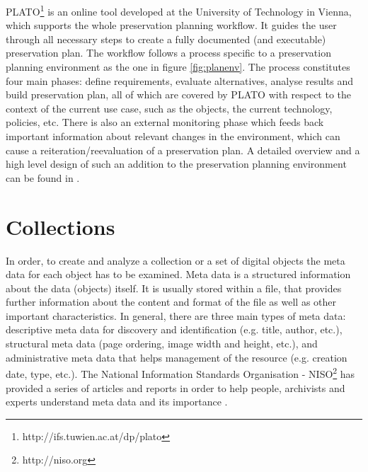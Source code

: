 PLATO\footnote{http://ifs.tuwien.ac.at/dp/plato} is an online tool developed at the University of Technology in Vienna, which supports the whole preservation planning workflow.
It guides the user through all necessary steps to create a fully documented (and executable) preservation plan. The workflow follows a process specific to a preservation planning environment as the one in figure \ref{fig:planenv}. The process constitutes four main phases: define requirements, evaluate alternatives, analyse results and build preservation plan, all of which are covered by PLATO with respect to the context of the current use case, such as the objects, the current technology, policies, etc.
There is also an external monitoring phase which feeds back important information about relevant changes in the environment, which can cause a reiteration/reevaluation of a preservation plan. A detailed overview and a high level design of such an addition to the preservation planning environment can be found in \cite{duretec:2012:watch}.



\section{Collections}
In order, to create and analyze a collection or a set of digital objects the meta data for each object has to be examined. Meta data is a structured information about the data (objects) itself. It is usually stored within a file, that provides further information about the content and format of the file as well as other important characteristics. In general, there are three main types of meta data: descriptive meta data for discovery and identification (e.g. title, author, etc.), structural meta data (page ordering, image width and height, etc.), and administrative meta data that helps management of the resource (e.g. creation date, type, etc.). The National Information Standards Organisation - NISO\footnote{http://niso.org} has provided a series of articles and reports in order to help people, archivists and experts understand meta data and its importance \cite{citeulike:6387279}.

